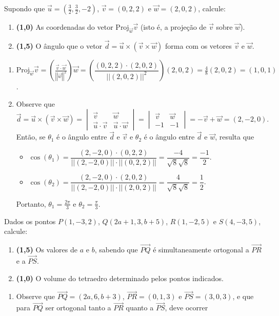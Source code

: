 \documentclass[12pt,a4paper]{article}
\newcommand{\vect}[1]{\overrightarrow{#1}}
\newcommand{\norm}[1]{\left|\left|{#1}\right|\right|}
\begin{document}
\begin{ExerciseList}
\Exercise[title={2,5}] Supondo que
$\vec{u} = \left(\frac{3}{2}, \frac{3}{2}, -2\right)$,
$\vec{v} = (0,2,2)$ e
$\vec{w} = (2,0,2)$, calcule:
\begin{enumerate}
\item \textbf{(1,0)} As coordenadas do vetor $\text{Proj}_{\vec{w}} \vec{v}$ (isto é, a projeção de $\vec{v}$ sobre $\vec{w}$).
\item \textbf{(1,5)} O ângulo que o vetor $\vec{d} = \vec{u} \times (\vec{v} \times \vec{w})$ forma com os vetores $\vec{v}$ e $\vec{w}$.
\end{enumerate} 
\Answer
\begin{enumerate}
\item $\text{Proj}_{\vec{w}} \vec{v}
= \left( \frac{\vec{v} \cdot \vec{w}}{ \norm{ \vec{w} }^2} \right) \vec{w}
= \left( \dfrac{ (0,2,2) \cdot (2,0,2) }{ \norm{ (2,0,2) }^2} \right) (2,0,2)
= \frac{ 4 }{ 8 } (2,0,2)
= (1,0,1)$.
\item Observe que $
\vec{d}
= \vec{u} \times ( \vec{v} \times \vec{w})
= \begin{vmatrix}
\vec{v}               &               \vec{w} \\
\vec{u} \cdot \vec{v} & \vec{u} \cdot \vec{w}
\end{vmatrix}
= \begin{vmatrix}
\vec{v} & \vec{w} \\
     -1 &      -1
\end{vmatrix}
= -\vec{v} + \vec{w} = (2,-2,0).
$
Então, se $\theta_1$ é o ângulo entre $\vec{d}$ e $\vec{v}$ e $\theta_2$ é o ângulo entre $\vec{d}$ e $\vec{w}$, resulta que
\begin{itemize}
\item $\cos( \theta_1 )
= \dfrac{ (2,-2,0) \cdot (0,2,2) }{ \norm{ (2,-2,0) } \cdot \norm{ (0,2,2) } }
= \dfrac{-4}{\sqrt{8} \sqrt{8} }
= \dfrac{-1}{2}$.
\item $\cos( \theta_2 )
= \dfrac{ (2,-2,0) \cdot (2,0,2) }{ \norm{ (2,-2,0) } \cdot  \norm{ (2,0,2) } }
= \dfrac{4}{\sqrt{8} \sqrt{8} }
= \dfrac{1}{2}$.
\end{itemize}
Portanto, $\theta_1 = \frac{2\pi}{3}$ e $\theta_2 = \frac{\pi}{3}$.
\end{enumerate} 

\Exercise[title={2,5}] Dados os pontos $P(1,-3,2)$, $Q(2a+1, 3, b + 5)$, $R(1,-2,5)$ e $S(4,-3,5)$, calcule:
\begin{enumerate}
\item \textbf{(1,5)} Os valores de $a$ e $b$, sabendo que $\vect{PQ}$ é simultaneamente ortogonal a $\vect{PR}$ e a $\vect{PS}$.
\item \textbf{(1,0)} O volume do tetraedro determinado pelos pontos indicados.
\end{enumerate} 
\Answer
\begin{enumerate}
\item Observe que
$\vect{PQ} = (2a, 6,b+3)$,
$\vect{PR} = (0,1,3)$ e
$\vect{PS} = (3,0,3)$, e que para $\vect{PQ}$ ser ortogonal tanto a $\vect{PR}$ quanto a $\vect{PS}$, deve ocorrer


\end{enumerate}
\end{ExerciseList}
\end{document}

